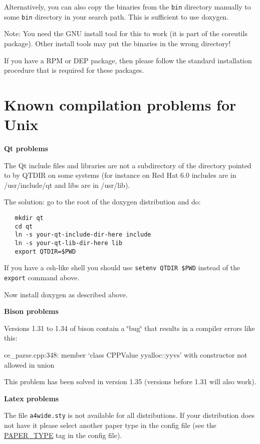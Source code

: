 Alternatively, you can also copy the binaries from the {\tt bin} directory manually to some {\tt bin} directory in your search path. This is sufficient to use doxygen.

\begin{Desc}
\item[Note:]You need the GNU install tool for this to work (it is part of the coreutils package). Other install tools may put the binaries in the wrong directory!\end{Desc}
If you have a RPM or DEP package, then please follow the standard installation procedure that is required for these packages.\hypertarget{install_unix_problems}{}\section{Known compilation problems for Unix}\label{install_unix_problems}
{\bf Qt problems}

The Qt include files and libraries are not a subdirectory of the directory pointed to by QTDIR on some systems (for instance on Red Hat 6.0 includes are in /usr/include/qt and libs are in /usr/lib).

The solution: go to the root of the doxygen distribution and do: 

\footnotesize\begin{verbatim}
   mkdir qt
   cd qt
   ln -s your-qt-include-dir-here include
   ln -s your-qt-lib-dir-here lib
   export QTDIR=$PWD
\end{verbatim}
\normalsize


If you have a csh-like shell you should use {\tt setenv QTDIR \$PWD} instead of the {\tt export} command above.

Now install doxygen as described above.

{\bf Bison problems}

Versions 1.31 to 1.34 of bison contain a \char`\"{}bug\char`\"{} that results in a compiler errors like this:

ce\_\-parse.cpp:348: member `class CPPValue yyalloc::yyvs' with constructor not allowed in union

This problem has been solved in version 1.35 (versions before 1.31 will also work).

{\bf Latex problems}

The file {\tt a4wide.sty} is not available for all distributions. If your distribution does not have it please select another paper type in the config file (see the \hyperlink{config_cfg_paper_type}{PAPER\_\-TYPE} tag in the config file).

